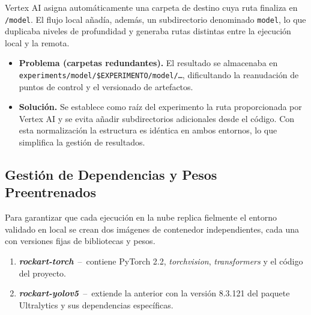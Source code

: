 Vertex AI asigna automáticamente una carpeta de destino cuya ruta finaliza en \texttt{/model}.
El flujo local añadía, además, un subdirectorio denominado \texttt{model}, lo que duplicaba niveles de profundidad y generaba rutas distintas entre la ejecución local y la remota.

\begin{itemize}
  \item \textbf{Problema (carpetas redundantes).}
        El resultado se almacenaba en \texttt{experiments/model/\$EXPERIMENTO/model/\dots}, dificultando la reanudación de puntos de control y el versionado de artefactos.
  \item \textbf{Solución.}
        Se establece como raíz del experimento la ruta proporcionada por Vertex AI y se evita añadir subdirectorios adicionales desde el código.
        Con esta normalización la estructura es idéntica en ambos entornos, lo que simplifica la gestión de resultados.
\end{itemize}

\subsection{Gestión de Dependencias y Pesos Preentrenados}\label{ssec:deps}

Para garantizar que cada ejecución en la nube replica fielmente el entorno validado en local se crean dos imágenes de contenedor independientes, cada una con versiones fijas de bibliotecas y pesos.

\begin{enumerate}
  \item \textbf{\textit{rockart-torch}} \,–\, contiene PyTorch 2.2, \textit{torchvision}, \textit{transformers} y el código del proyecto.
  \item \textbf{\textit{rockart-yolov5}} \,–\, extiende la anterior con la versión 8.3.121 del paquete Ultralytics y sus dependencias específicas.
\end{enumerate}

